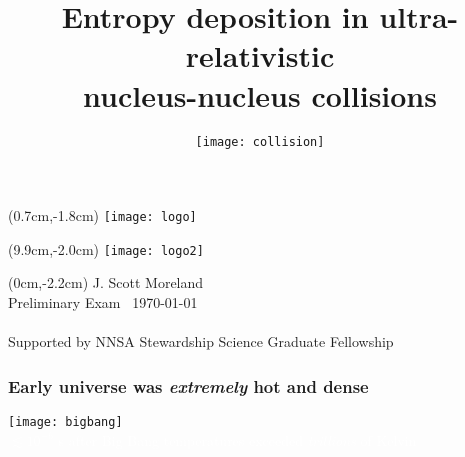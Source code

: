 \documentclass[svgnames]{beamer}
\title[Entropy deposition in nuclear collisions]{Entropy deposition in ultra-relativistic \\ nucleus-nucleus collisions}
\subtitle[Duke U.]{\vspace{0.2 in} \texttt{[image: collision]}}
\author[J. Scott Moreland]{}
\date[\today]{}
\begin{document}
\begin{frame}

\maketitle

\begin{textblock*}{2cm}(0.7cm,-1.8cm)
  \texttt{[image: logo]}
\end{textblock*}

\begin{textblock*}{2cm}(9.9cm,-2.0cm)
  \texttt{[image: logo2]}
\end{textblock*}

\begin{textblock*}{\linewidth}(0cm,-2.2cm)
  \centering
  J. Scott Moreland \\ Preliminary Exam \textbar ~\today \\ ~ 
  \\ \tiny Supported by NNSA Stewardship Science Graduate Fellowship
\end{textblock*}
  
\end{frame}

{
\begin{frame}

 \frametitle{Early universe was \emph{extremely} hot and dense}
 
 \begin{center}
  \texttt{[image: bigbang]} \\
  \vspace{0.2 in}
  \textcolor{white}{$\lesssim 10^{-6}$ s after Big Bang temperatures exceeded \emph{trillions} of Kelvin} 
 \end{center}
 
\end{frame}}
\end{document}

